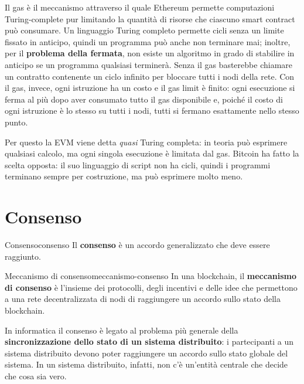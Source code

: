 \documentclass[a4paper, 11pt, oneside]{book}
\begin{document}
	Il gas è il meccanismo attraverso il quale Ethereum permette computazioni
	Turing-complete pur limitando la quantità di risorse che ciascuno smart contract
	può consumare. Un linguaggio Turing completo permette cicli senza un limite fissato
	in anticipo, quindi un programma può anche non terminare mai; inoltre, per il
	\textbf{problema della fermata}, non esiste un algoritmo in grado di stabilire in
	anticipo se un programma qualsiasi terminerà. Senza il gas basterebbe chiamare un
	contratto contenente un ciclo infinito per bloccare tutti i nodi della rete. Con il
	gas, invece, ogni istruzione ha un costo e il gas limit è finito: ogni esecuzione si
	ferma al più dopo aver consumato tutto il gas disponibile e, poiché il costo di ogni
	istruzione è lo stesso su tutti i nodi, tutti si fermano esattamente nello stesso
	punto.

	\begin{nota}
		Per questo la EVM viene detta \textit{quasi} Turing completa: in teoria può
		esprimere qualsiasi calcolo, ma ogni singola esecuzione è limitata dal gas.
		Bitcoin ha fatto la scelta opposta: il suo linguaggio di script non ha cicli,
		quindi i programmi terminano sempre per costruzione, ma può esprimere molto meno.
	\end{nota}

	\section{Consenso}
	\begin{definizione}{Consenso}{consenso}
		Il \textbf{consenso} è un accordo generalizzato che deve essere raggiunto.
	\end{definizione}

	\begin{definizione}{Meccanismo di consenso}{meccanismo-consenso}
		In una blockchain, il \textbf{meccanismo di consenso} è l'insieme dei protocolli,
		degli incentivi e delle idee che permettono a una rete decentralizzata di nodi di
		raggiungere un accordo sullo stato della blockchain.
	\end{definizione}

	In informatica il consenso è legato al problema più generale della
	\textbf{sincronizzazione dello stato di un sistema distribuito}: i partecipanti a un
	sistema distribuito devono poter raggiungere un accordo sullo stato globale del
	sistema. In un sistema distribuito, infatti, non c'è un'entità centrale che decide
	che cosa sia vero.
\end{document}
